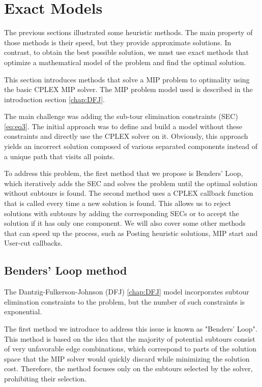 
\chapter{Exact Models}
The previous sections illustrated some heuristic methods. The main property of those methods is their speed, but they provide approximate solutions. In contrast, to obtain the best possible solution, we must use exact methods that optimize a mathematical model of the problem and find the optimal solution.

This section introduces methods that solve a MIP problem to optimality using the basic CPLEX \cite{Cplex:TSP} MIP solver. The MIP problem model used is described in the introduction section \ref{chap:DFJ}.

The main challenge was adding the sub-tour elimination constraints (SEC) \ref{eq:eq3}. The initial approach was to define and build a model without these constraints and directly use the CPLEX solver on it. Obviously, this approach yields an incorrect solution composed of various separated components instead of a unique path that visits all points.

To address this problem, the first method that we propose is Benders' Loop, which iteratively adds the SEC and solves the problem until the optimal solution without subtours is found. The second method uses a CPLEX callback function that is called every time a new solution is found. This allows us to reject solutions with subtours by adding the corresponding SECs or to accept the solution if it has only one component.
We will also cover some other methods that can speed up the process, such as Posting heuristic solutions, MIP start and User-cut callbacks.

\section{Benders' Loop method}
The Dantzig-Fulkerson-Johnson (DFJ) \ref{chap:DFJ} model incorporates subtour elimination constraints to the problem, but the number of such constraints is exponential.

The first method we introduce to address this issue is known as "Benders' Loop". This method is based on the idea that the majority of potential subtours consist of very unfavorable edge combinations, which correspond to parts of the solution space that the MIP solver would quickly discard while minimizing the solution cost. Therefore, the method focuses only on the subtours selected by the solver, prohibiting their selection.

